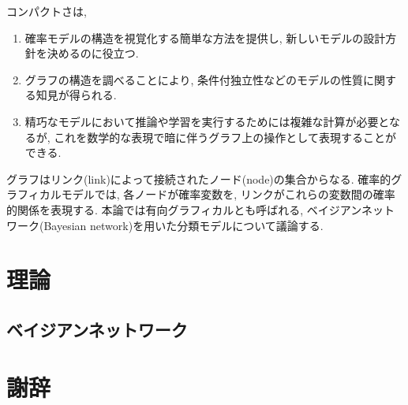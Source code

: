 \documentclass[a4paper]{jarticle}
\begin{document}
コンパクトさは, 


\begin{enumerate}

\item 確率モデルの構造を視覚化する簡単な方法を提供し, 新しいモデルの設計方針を決めるのに役立つ.

\item グラフの構造を調べることにより, 条件付独立性などのモデルの性質に関する知見が得られる.

\item 精巧なモデルにおいて推論や学習を実行するためには複雑な計算が必要となるが, これを数学的な表現で暗に伴うグラフ上の操作として表現することができる.

\end{enumerate}

グラフはリンク(link)によって接続されたノード(node)の集合からなる. 確率的グラフィカルモデルでは, 各ノードが確率変数を, リンクがこれらの変数間の確率的関係を表現する. 本論では有向グラフィカルとも呼ばれる, ベイジアンネットワーク(Bayesian network)を用いた分類モデルについて議論する.

\section{理論}

\subsection{ベイジアンネットワーク}

\section{謝辞}



\newpage
{} %




\end{document}

